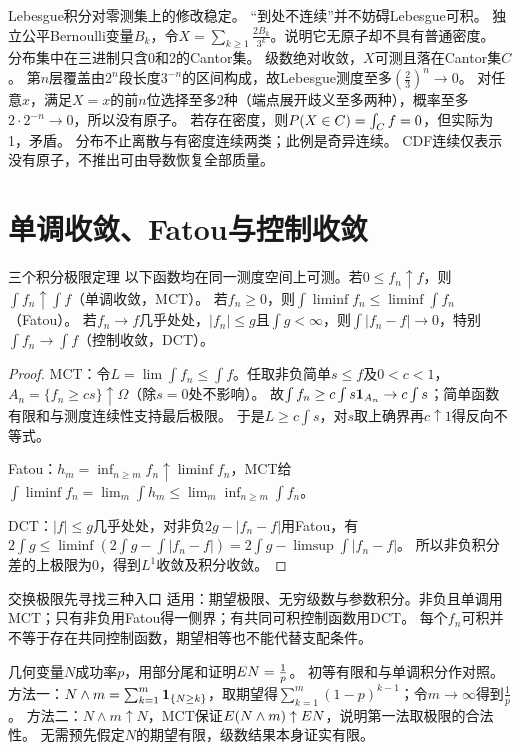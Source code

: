 {Lebesgue积分对零测集上的修改稳定。}
{“到处不连续”并不妨碍Lebesgue可积。}
{独立公平Bernoulli变量$B_k$，令$X=\sum_{k\ge1}\frac{2B_k}{3^k}$。说明它无原子却不具有普通密度。}
{分布集中在三进制只含0和2的Cantor集。}
{级数绝对收敛，$X$可测且落在Cantor集$C$。
第$n$层覆盖由$2^n$段长度$3^{-n}$的区间构成，故Lebesgue测度至多$(\frac{2}{3})^n\to0$。
对任意$x$，满足$X=x$的前$n$位选择至多2种（端点展开歧义至多两种），概率至多$2\cdot2^{-n}\to0$，所以没有原子。
若存在密度，则$P(X\in C)=\int_Cf=0$，但实际为1，矛盾。}
{分布不止离散与有密度连续两类；此例是奇异连续。}
{CDF连续仅表示没有原子，不推出可由导数恢复全部质量。}

\section{单调收敛、Fatou与控制收敛}\label{sec:103}
\begin{theorem}{三个积分极限定理}
以下函数均在同一测度空间上可测。若$0\le f_n\uparrow f$，则$\int f_n\uparrow\int f$（单调收敛，MCT）。
若$f_n\ge0$，则$\int\liminf f_n\le\liminf\int f_n$（Fatou）。
若$f_n\to f$几乎处处，$|f_n|\le g$且$\int g<\infty$，则$\int|f_n-f|\to0$，特别$\int f_n\to\int f$（控制收敛，DCT）。
\end{theorem}
\begin{proof}
MCT：令$L=\lim\int f_n\le\int f$。任取非负简单$s\le f$及$0<c<1$，$A_n=\{f_n\ge cs\}\uparrow\Omega$（除$s=0$处不影响）。
故$\int f_n\ge c\int s\mathbf1_{A_n}\to c\int s$；简单函数有限和与测度连续性支持最后极限。
于是$L\ge c\int s$，对$s$取上确界再$c\uparrow1$得反向不等式。

Fatou：$h_m=\inf_{n\ge m}f_n\uparrow\liminf f_n$，MCT给$\int\liminf f_n=\lim_m\int h_m\le\lim_m\inf_{n\ge m}\int f_n$。

DCT：$|f|\le g$几乎处处，对非负$2g-|f_n-f|$用Fatou，有
$2\int g\le\liminf(2\int g-\int|f_n-f|)=2\int g-\limsup\int|f_n-f|$。
所以非负积分差的上极限为0，得到$L^1$收敛及积分收敛。
\end{proof}
\begin{method}{交换极限先寻找三种入口}
适用：期望极限、无穷级数与参数积分。非负且单调用MCT；只有非负用Fatou得一侧界；有共同可积控制函数用DCT。
每个$f_n$可积并不等于存在共同控制函数，期望相等也不能代替支配条件。
\end{method}
{几何变量$N$成功率$p$，用部分尾和证明$E N=\frac{1}{p}$。}
{初等有限和与单调积分作对照。}
{方法一：$N\wedge m=\sum_{k=1}^m\mathbf1_{\{N\ge k\}}$，取期望得$\sum_{k=1}^m(1-p)^{k-1}$；令$m\to\infty$得到$\frac{1}{p}$。
方法二：$N\wedge m\uparrow N$，MCT保证$E(N\wedge m)\uparrow E N$，说明第一法取极限的合法性。
无需预先假定$N$的期望有限，级数结果本身证实有限。}
